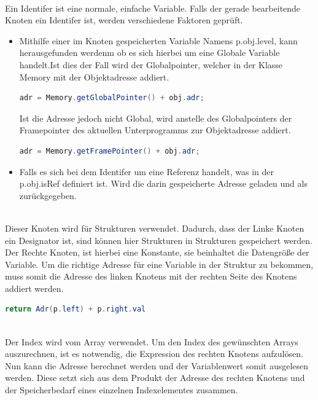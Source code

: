 \\
Ein Identifer ist eine normale, einfache Variable. Falls der gerade bearbeitende Knoten ein Identifer ist, werden verschiedene Faktoren geprüft.
\begin{itemize}
 \item Mithilfe einer im Knoten gespeicherten Variable Namens p.obj.level, kann herausgefunden werdenm ob es sich hierbei um eine Globale Variable handelt.Ist dies der Fall wird der Globalpointer, welcher in der Klasse Memory mit der Objektadresse addiert.
 \begin{lstlisting}[language=JAVA]
 adr = Memory.getGlobalPointer() + obj.adr;	
  \end{lstlisting}
Ist die Adresse jedoch nicht Global, wird anstelle des Globalpointers der Framepointer des aktuellen Unterprogramms zur Objektadresse addiert.
   \begin{lstlisting}[language=JAVA]
 adr = Memory.getFramePointer() + obj.adr;
  \end{lstlisting}
 \item Falls es sich bei dem Identifer um eine Referenz handelt, was in der p.obj.isRef definiert ist. Wird die darin gespeicherte Adresse geladen und als zurückgegeben.
\end{itemize}

\\
Dieser Knoten wird für Strukturen verwendet. Dadurch, dass der Linke Knoten ein Designator ist, sind können hier Strukturen in Strukturen gespeichert werden. Der Rechte Knoten, ist hierbei eine Konstante, sie beinhaltet die Datengröße der Variable. Um die richtige Adresse für eine Variable in der Struktur zu bekommen, muss somit die Adresse des linken
Knotens mit der rechten Seite des Knotens addiert werden.

\begin{lstlisting}[language=JAVA]
return Adr(p.left) + p.right.val
\end{lstlisting}

\\
Der Index wird vom Array verwendet. Um den Index des gewünschten Arrays auszurechnen, ist es notwendig, die Expression des rechten Knotens aufzulösen.
Nun kann die Adresse berechnet werden und der Variablenwert somit ausgelesen werden. Diese setzt sich aus dem Produkt der Adresse des rechten Knotens und der Speicherbedarf eines einzelnen Indexelementes zusammen.

